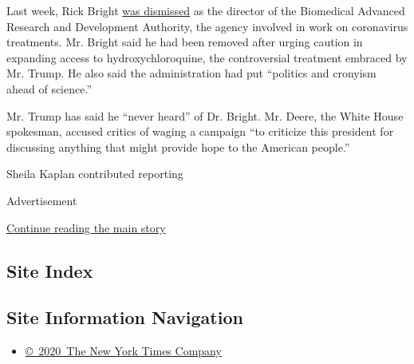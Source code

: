 Last week, Rick Bright
\href{https://www.nytimes.com/2020/04/22/us/politics/rick-bright-trump-hydroxychloroquine-coronavirus.html}{was
dismissed} as the director of the Biomedical Advanced Research and
Development Authority, the agency involved in work on coronavirus
treatments. Mr. Bright said he had been removed after urging caution in
expanding access to hydroxychloroquine, the controversial treatment
embraced by Mr. Trump. He also said the administration had put
``politics and cronyism ahead of science.''

Mr. Trump has said he ``never heard'' of Dr. Bright. Mr. Deere, the
White House spokesman, accused critics of waging a campaign ``to
criticize this president for discussing anything that might provide hope
to the American people.''

Sheila Kaplan contributed reporting

Advertisement

\protect\hyperlink{after-bottom}{Continue reading the main story}

\hypertarget{site-index}{%
\subsection{Site Index}\label{site-index}}

\hypertarget{site-information-navigation}{%
\subsection{Site Information
Navigation}\label{site-information-navigation}}

\begin{itemize}
\tightlist
\item
  \href{https://help.nytimes.com/hc/en-us/articles/115014792127-Copyright-notice}{©~2020~The
  New York Times Company}
\end{itemize}

